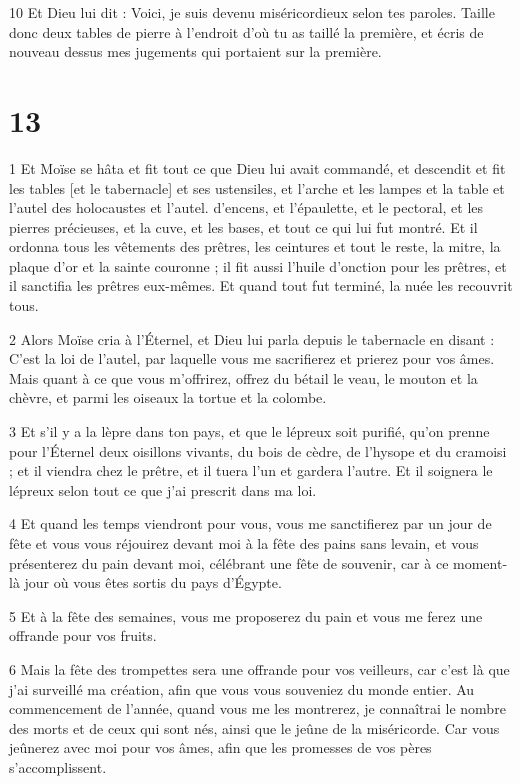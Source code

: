 \par 10 Et Dieu lui dit : Voici, je suis devenu miséricordieux selon tes paroles. Taille donc deux tables de pierre à l'endroit d'où tu as taillé la première, et écris de nouveau dessus mes jugements qui portaient sur la première.

\chapter{13}

\par 1 Et Moïse se hâta et fit tout ce que Dieu lui avait commandé, et descendit et fit les tables [et le tabernacle] et ses ustensiles, et l'arche et les lampes et la table et l'autel des holocaustes et l'autel. d'encens, et l'épaulette, et le pectoral, et les pierres précieuses, et la cuve, et les bases, et tout ce qui lui fut montré. Et il ordonna tous les vêtements des prêtres, les ceintures et tout le reste, la mitre, la plaque d'or et la sainte couronne ; il fit aussi l'huile d'onction pour les prêtres, et il sanctifia les prêtres eux-mêmes. Et quand tout fut terminé, la nuée les recouvrit tous.

\par 2 Alors Moïse cria à l'Éternel, et Dieu lui parla depuis le tabernacle en disant : C'est la loi de l'autel, par laquelle vous me sacrifierez et prierez pour vos âmes. Mais quant à ce que vous m'offrirez, offrez du bétail le veau, le mouton et la chèvre, et parmi les oiseaux la tortue et la colombe.

\par 3 Et s'il y a la lèpre dans ton pays, et que le lépreux soit purifié, qu'on prenne pour l'Éternel deux oisillons vivants, du bois de cèdre, de l'hysope et du cramoisi ; et il viendra chez le prêtre, et il tuera l'un et gardera l'autre. Et il soignera le lépreux selon tout ce que j'ai prescrit dans ma loi.

\par 4 Et quand les temps viendront pour vous, vous me sanctifierez par un jour de fête et vous vous réjouirez devant moi à la fête des pains sans levain, et vous présenterez du pain devant moi, célébrant une fête de souvenir, car à ce moment-là jour où vous êtes sortis du pays d’Égypte.

\par 5 Et à la fête des semaines, vous me proposerez du pain et vous me ferez une offrande pour vos fruits.

\par 6 Mais la fête des trompettes sera une offrande pour vos veilleurs, car c'est là que j'ai surveillé ma création, afin que vous vous souveniez du monde entier. Au commencement de l'année, quand vous me les montrerez, je connaîtrai le nombre des morts et de ceux qui sont nés, ainsi que le jeûne de la miséricorde. Car vous jeûnerez avec moi pour vos âmes, afin que les promesses de vos pères s'accomplissent.

